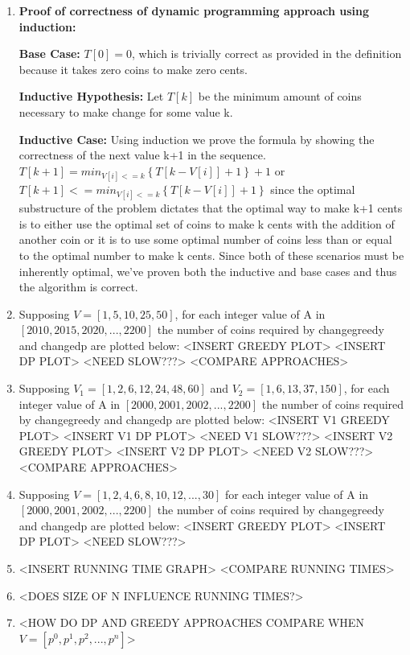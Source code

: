\documentclass[paper=a4, fontsize=11pt]{scrartcl} %
\numberwithin{equation}{section} %
\numberwithin{figure}{section} %
\numberwithin{table}{section} %
\begin{document}
\begin{enumerate}
    \item \textbf{Proof of correctness of dynamic programming approach using induction:}
    
    \textbf{Base Case:} $T[0] = 0$, which is trivially correct as provided in the definition because it takes zero coins to make zero cents.
    
    \textbf{Inductive Hypothesis:} Let $T[k]$ be the minimum amount of coins necessary to make change for some value k.
    
    \textbf{Inductive Case:} Using induction we prove the formula by showing the correctness of the next value k+1 in the sequence. $T[k+1] = min_{V[i]<=k}\left\{T[k - V[i]] + 1\right\} + 1$ or $T[k+1] <= min_{V[i]<=k}\left\{T[k - V[i]] + 1\right\}$ since the optimal substructure of the problem dictates that the optimal way to make k+1 cents is to either use the optimal set of coins to make k cents with the addition of another coin or it is to use some optimal number of coins less than or equal to the optimal number to make k cents. Since both of these scenarios must be inherently optimal, we've proven both the inductive and base cases and thus the algorithm is correct.
    
    \item Supposing $V = [1, 5, 10, 25, 50]$, for each integer value of A in $[2010, 2015, 2020, ..., 2200]$ the number of coins required by changegreedy and changedp are plotted below: <INSERT GREEDY PLOT> <INSERT DP PLOT> <NEED SLOW???> <COMPARE APPROACHES>
    
    \item Supposing $V_1 = [1, 2, 6, 12, 24, 48, 60]$ and $V_2 = [1, 6, 13, 37, 150]$, for each integer value of A in $[2000, 2001, 2002, ..., 2200]$ the number of coins required by changegreedy and changedp are plotted below: <INSERT V1 GREEDY PLOT> <INSERT V1 DP PLOT> <NEED V1 SLOW???> <INSERT V2 GREEDY PLOT> <INSERT V2 DP PLOT> <NEED V2 SLOW???> <COMPARE APPROACHES>
    
    \item Supposing $V = [1, 2, 4, 6, 8, 10, 12, ..., 30]$ for each integer value of A in $[2000, 2001, 2002, ..., 2200]$ the number of coins required by changegreedy and changedp are plotted below: <INSERT GREEDY PLOT> <INSERT DP PLOT> <NEED SLOW???>
    
    \item <INSERT TREND LINE EQUATIONS AND FIND RUNTIME> <INSERT RUNNING TIME GRAPH> <COMPARE RUNNING TIMES>
    
    \item <PLOT RUNNING TIMES AS FUNCTION OF NUMBER OF DENOMINATIONS> <DOES SIZE OF N INFLUENCE RUNNING TIMES?>
    
    \item <HOW DO DP AND GREEDY APPROACHES COMPARE WHEN $V = [p^0, p^1, p^2, ..., p^n]$>
\end{enumerate}
\end{document}
